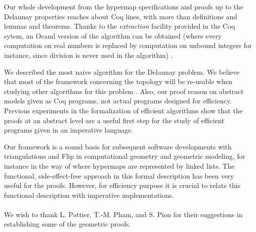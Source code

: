 \documentclass{llncs}
\begin{document}
Our whole development from the hypermap specifications and proofs
up to the Delaunay properties reaches about  Coq lines, with
more than  definitions and  lemmas and theorems.  Thanks to
the {\sl extraction} facility provided in the Coq sytem, an Ocaml version
of the algorithm can be obtained (where every computation on real numbers
is replaced by computation on unbound integers for instance, since
division is never used in the algorithm) \cite{duf:ber10}.

We described the most naive algorithm for the Delaunay problem.  We
believe that most of the framework concerning the topology will be
re-usable when studying other algorithms for this problem
\cite{gs85,ede00,deb08}.  Also, our proof reason on abstract models
given as Coq programs, not actual programs
designed for efficiency.  Previous experiments in the formalization of
efficient algorithms \cite{BMZ02} show that the proofs at an abstract level are
a useful first step for the study of efficient programs given in
an imperative language.

Our framework is a sound basis for subsequent software developments
with triangulations and Flip in computational geometry and geometric
modeling, for instance in the way of
\cite{ber:duf,duf:pui,duf07,bru:duf:mag09} where hypermaps are
represented by linked lists.  The functional, side-effect-free
approach in this formal description has been very useful for the proofs.
However, for efficiency purpose it is crucial to relate this functional description with imperative implementations.
\\ \\
  We wish to thank L. Pottier,
T.-M. Pham, and S. Pion for their suggestions in establishing some of
the geometric proofs.
\end{document}
